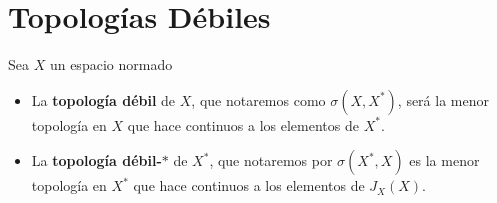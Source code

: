 \section{Topologías Débiles}

\begin{definicion}
    Sea $X$ un espacio normado
    \begin{itemize}
        \item La \textbf{topología débil} de $X$, que notaremos como $\sigma(X,X^*)$, será la menor topología en $X$ que hace continuos a los elementos de $X^*$.
        \item La \textbf{topología débil-$*$} de $X^*$, que notaremos por $\sigma(X^*, X)$ es la menor topología en $X^*$ que hace continuos a los elementos de $J_X(X)$.
    \end{itemize}
\end{definicion}

